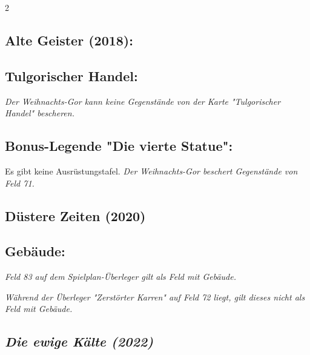 \documentclass[10pt, a4paper, oneside]{book}
\newcommand{\fan}[1]{\textit{#1}}
\begin{document}
\begin{multicols*}{2}
\begin{bgcolor}[color-bb]
\end{bgcolor}


\begin{bgcolor}[color-ag]
\section{Alte Geister (2018):}

\subsection{Tulgorischer Handel:}

\fan{Der Weihnachts-Gor kann keine Gegenstände von der Karte "Tulgorischer Handel" bescheren.}


\subsection{Bonus-Legende "Die vierte Statue":}

Es gibt keine Ausrüstungstafel. \fan{Der Weihnachts-Gor beschert Gegenstände von Feld 71.}

\end{bgcolor}



\begin{bgcolor}[color-dz]
\section{Düstere Zeiten (2020)}


\subsection{Gebäude:}

\fan{Feld 83 auf dem Spielplan-Überleger gilt als Feld mit Gebäude.}

\fan{Während der Überleger "Zerstörter Karren" auf Feld 72 liegt, gilt dieses nicht als Feld mit Gebäude.}

\end{bgcolor}





\columnbreak




\begin{bgcolor}
\section{\fan{Die ewige Kälte (2022)}}


\end{bgcolor}
\end{multicols*}
\end{document}
